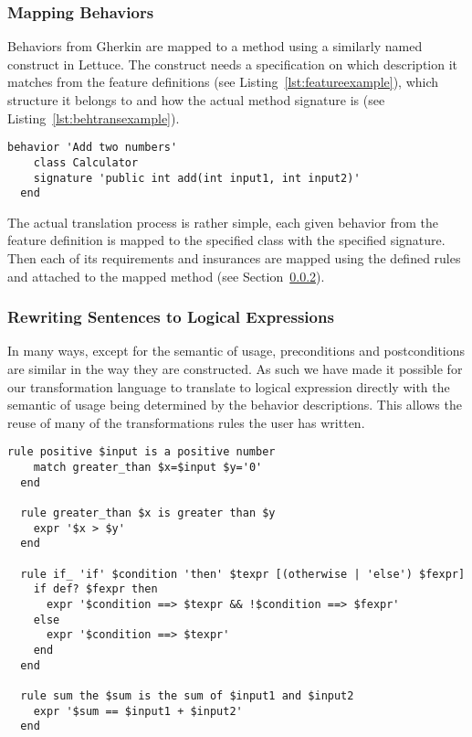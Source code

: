 \subsubsection{Mapping Behaviors}
\label{sub:Mapping Behaviors}

Behaviors from Gherkin are mapped to a method using a similarly named
construct in Lettuce. The construct needs a specification on which
description it matches from the feature definitions (see Listing~\ref{lst:featureexample}),
which structure it belongs to and how the actual method signature is
(see Listing~\ref{lst:behtransexample}).

\begin{lstlisting}[caption={General Behavior Description of Adding Natural Numbers},label={lst:behtransexample}]
  behavior 'Add two numbers'
    class Calculator
    signature 'public int add(int input1, int input2)'
  end
\end{lstlisting}

The actual translation process is rather simple,
each given behavior from the feature definition is mapped to the
specified class with the specified signature. Then each of its requirements
and insurances are mapped using the defined rules and attached to the mapped
method (see Section~\ref{sub:RewritingSentencestoLogicalExpressions}).

\subsubsection{Rewriting Sentences to Logical Expressions}
\label{sub:RewritingSentencestoLogicalExpressions}

In many ways, except for the semantic of usage,
preconditions and postconditions are similar in the way they are constructed.
As such we have made it possible for our transformation language to translate
to logical expression directly with the semantic of usage being determined by
the behavior descriptions. 
This allows the reuse of many of the transformations rules the user has written.


\begin{lstlisting}[caption={Different Types of Transformation Rules in Lettuce},label={lst:ruleexample}]
  rule positive $input is a positive number
    match greater_than $x=$input $y='0'
  end

  rule greater_than $x is greater than $y
    expr '$x > $y'
  end

  rule if_ 'if' $condition 'then' $texpr [(otherwise | 'else') $fexpr]
    if def? $fexpr then
      expr '$condition ==> $texpr && !$condition ==> $fexpr'
    else
      expr '$condition ==> $texpr'
    end
  end

  rule sum the $sum is the sum of $input1 and $input2
    expr '$sum == $input1 + $input2'
  end
\end{lstlisting}

